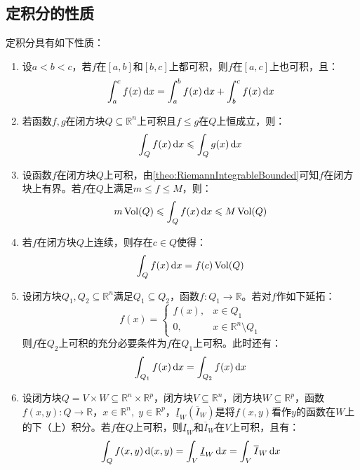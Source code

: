 \subsection{定积分的性质}
\begin{property}
	定积分具有如下性质：
	\begin{enumerate}
		\item 设$a<b<c$，若$f$在$[a,b]$和$[b,c]$上都可积，则$f$在$[a,c]$上也可积，且：
		\begin{equation*}
			\int_{a}^cf(x)\mathop{}\!\mathrm{d} x=\int_{a}^bf(x)\mathop{}\!\mathrm{d} x+\int_{b}^cf(x)\mathop{}\!\mathrm{d} x
		\end{equation*}
		\item 若函数$f,g$在闭方块$Q\subseteq\mathbb{R}^n$上可积且$f\leqslant g$在$Q$上恒成立，则：
		\begin{equation*}
			\int_Qf(x)\mathop{}\!\mathrm{d} x\leqslant\int_Qg(x)\mathop{}\!\mathrm{d} x
		\end{equation*}
		\item 设函数$f$在闭方块$Q$上可积，由\cref{theo:RiemannIntegrableBounded}可知$f$在闭方块上有界。若$f$在$Q$上满足$m\leqslant f\leqslant M$，则：
		\begin{equation*}
			m\operatorname{Vol}(Q)\leqslant\int_Qf(x)\mathop{}\!\mathrm{d} x\leqslant M\operatorname{Vol}(Q)
		\end{equation*}
		\item 若$f$在闭方块$Q$上连续，则存在$c\in Q$使得：
		\begin{equation*}
			\int_Qf(x)\mathop{}\!\mathrm{d} x=f(c)\operatorname{Vol}(Q)
		\end{equation*}
		\item 设闭方块$Q_1,Q_2\subseteq\mathbb{R}^{n}$满足$Q_1\subseteq Q_2$，函数$f:Q_1\to\mathbb{R}$。若对$f$作如下延拓：
		\begin{equation*}
			f(x)=
			\begin{cases}
				f(x),&x\in Q_1 \\
				0,&x\in\mathbb{R}^{n}\setminus Q_1
			\end{cases}
		\end{equation*}
		则$f$在$Q_2$上可积的充分必要条件为$f$在$Q_1$上可积。此时还有：
		\begin{equation*}
			\int_{Q_1}f(x)\mathop{}\!\mathrm{d} x=\int_{Q_2}f(x)\mathop{}\!\mathrm{d} x
		\end{equation*}
		\item 设闭方块$Q=V\times W\subseteq\mathbb{R}^{n}\times\mathbb{R}^{p}$，闭方块$V\subseteq\mathbb{R}^{n}$，闭方块$W\subseteq\mathbb{R}^{p}$，函数$f(x,y):Q\to\mathbb{R}$，$x\in\mathbb{R}^{n},\;y\in\mathbb{R}^{p}$，$\underline{I}_W(\overline{I}_W)$是将$f(x,y)$看作$y$的函数在$W$上的下（上）积分。若$f$在$Q$上可积，则$\underline{I}_W$和$\overline{I}_W$在$V$上可积，且有：
		\begin{equation*}
			\int_{Q}f(x,y)\mathop{}\!\mathrm{d}(x,y)=\int_{V}\underline{I}_W\mathop{}\!\mathrm{d} x=\int_{V}\overline{I}_W\mathop{}\!\mathrm{d} x
		\end{equation*}
	\end{enumerate}
\end{property}
